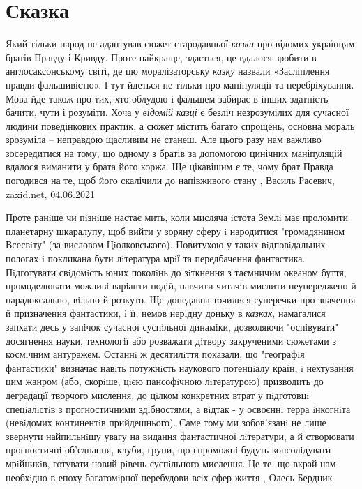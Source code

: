  
 
 
 
 
\chapter{Сказка}
\label{sec:slova.skazka}

Який тільки народ не адаптував сюжет стародавньої \emph{казки} про відомих
українцям братів Правду і Кривду. Проте найкраще, здається, це вдалося зробити
в англосаксонському світі, де цю моралізаторську \emph{казку} назвали
«Засліплення правди фальшивістю». І тут йдеться не тільки про маніпуляції та
перебріхування.  Мова йде також про тих, хто облудою і фальшем забирає в інших
здатність бачити, чути і розуміти. Хоча у \emph{відомій казці} є безліч
незрозумілих для сучасної людини поведінкових практик, а сюжет містить багато
спрощень, основна мораль зрозуміла – неправдою щасливим не станеш. Але цього
разу нам важливо зосередитися на тому, що одному з братів за допомогою цинічних
маніпуляцій вдалося виманити у брата його коржа. Ще цікавішим є те, чому брат
Правда погодився на те, щоб його скалічили до напівживого стану
, Василь Расевич, zaxid.net, 04.06.2021


Проте ранiше чи пiзнiше настає мить, коли мисляча iстота Землi має проломити
планетарну шкаралупу, щоб вийти у зоряну сферу i народитися "громадянином
Всесвiту" (за висловом Цiолковського). Повитухою у таких вiдповiдальних пологах
i покликана бути лiтература мрiї та передбачення фантастика. Пiдготувати
свiдомiсть юних поколiнь до зiткнення з таємничим океаном буття, промоделювати
можливi варiанти подiй, навчити читачiв мислити неупереджено й парадоксально,
вiльно й розкуто. Ще донедавна точилися суперечки про значення й призначення
фантастики, i її, немов нерiдну доньку в \emph{казках}, намагалися запхати десь у
запiчок сучасної суспiльної динамiки, дозволяючи "оспiвувати" досягнення науки,
технологiї або розважати дiтвору закрученими сюжетами з космiчним антуражем.
Останнi ж десятилiття показали, що "географiя фантастики" визначає навiть
потужнiсть наукового потенцiалу країн, i нехтування цим жанром (або, скорiше,
цiєю пансофiчною лiтературою) призводить до деградацiї творчого мислення, до
цiлком конкретних втрат у пiдготовцi спецiалiстiв з прогностичними здiбностями,
а вiдтак - у освоєннi терра iнкогнiта (невiдомих континентiв прийдешнього).
Саме тому ми зобов'язанi не лише звернути найпильнiшу увагу на видання
фантастичної лiтератури, а й створювати прогностичнi об'єднання, клуби, групи,
що спроможнi будуть консолiдувати мрiйникiв, готувати новий рiвень суспiльного
мислення. Це те, що вкрай нам необхiдно в епоху багатомiрної перебудови всiх
сфер життя
, Олесь Бердник

